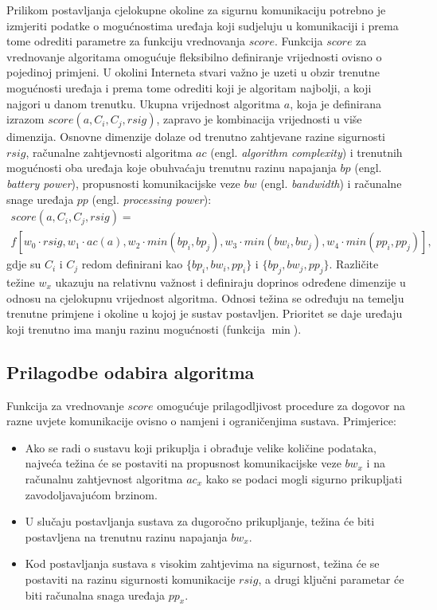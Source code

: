 Prilikom postavljanja cjelokupne okoline za sigurnu komunikaciju potrebno je
izmjeriti podatke o mogućnostima uređaja koji sudjeluju u komunikaciji i prema
tome odrediti parametre za funkciju vrednovanja $score$.
Funkcija $score$ za vrednovanje algoritama omogućuje fleksibilno definiranje
vrijednosti ovisno o pojedinoj primjeni. U okolini Interneta stvari važno je
uzeti u obzir trenutne mogućnosti uređaja i prema tome odrediti koji je
algoritam najbolji, a koji najgori u danom trenutku. Ukupna vrijednost algoritma
$a$, koja je definirana izrazom $score(a,C_i,C_j,rsig)$, zapravo je
kombinacija vrijednosti u više dimenzija. Osnovne dimenzije dolaze od trenutno
zahtjevane razine sigurnosti $rsig$, računalne zahtjevnosti algoritma $ac$
(engl. \emph{algorithm complexity}) i trenutnih mogućnosti oba uređaja koje
obuhvaćaju trenutnu razinu napajanja $bp$ (engl. \emph{battery power}),
propusnosti komunikacijske veze $bw$ (engl. \emph{bandwidth}) i računalne snage
uređaja $pp$ (engl. \emph{processing power}):
\vspace{-10pt}
\begin{multline}
    score(a,C_i,C_j,rsig)=\\f[w_{0}\cdot rsig, w_{1}\cdot ac(a), 
	w_{2}\cdot min(bp_i,bp_j), 
    w_{3}\cdot min(bw_i,bw_j), w_{4}\cdot min(pp_i,pp_j)],
\end{multline}
gdje su $C_i$ i $C_j$ redom definirani kao $\{bp_i,bw_i,pp_i\}$ i
$\{bp_j,bw_j,pp_j\}$. Različite težine $w_x$ ukazuju na relativnu važnost
i definiraju doprinos određene dimenzije u odnosu na cjelokupnu vrijednost
algoritma. Odnosi težina se određuju na temelju trenutne primjene i okoline u
kojoj je sustav postavljen. Prioritet se daje uređaju koji trenutno ima manju
razinu mogućnosti (funkcija $\min$).

\subsection{Prilagodbe odabira algoritma}

Funkcija za vrednovanje $score$ omogućuje prilagodljivost procedure za dogovor
na razne uvjete komunikacije ovisno o namjeni i ograničenjima sustava.
Primjerice:
\begin{itemize}
    \item Ako se radi o sustavu koji prikuplja i obrađuje velike količine
	podataka, najveća težina će se postaviti na propusnost komunikacijske
	veze $bw_x$ i na računalnu zahtjevnost algoritma $ac_x$ kako se podaci
	mogli sigurno prikupljati zavodoljavajućom brzinom.
    \item U slučaju postavljanja sustava za dugoročno prikupljanje, težina će
	biti postavljena na trenutnu razinu napajanja $bw_x$.
    \item Kod postavljanja sustava s visokim zahtjevima na sigurnost, težina će
	se postaviti na razinu sigurnosti komunikacije $rsig$, a drugi ključni
	parametar će biti računalna snaga uređaja $pp_x$.
\end{itemize}

